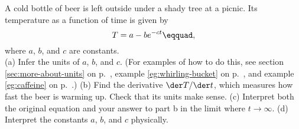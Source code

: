 A cold bottle of beer is left outside under a shady tree
at a picnic. Its temperature as a function of time is given
by
\begin{equation*}
  T = a - b e^{-ct}\eqquad,
\end{equation*}
where $a$, $b$, and $c$ are constants.\\
(a) Infer the units of $a$, $b$, and $c$. (For examples of how to do this, see
section \ref{sec:more-about-units} on p.~\pageref{sec:more-about-units},
example \ref{eg:whirling-bucket} on p.~\pageref{eg:whirling-bucket}, and
example \ref{eg:caffeine} on p.~\pageref{eg:caffeine}.)\hwendpart
(b) Find the derivative $\der T/\der t$, which measures how fast the beer
is warming up. Check that its units make sense.\hwendpart
(c) Interpret both the original equation and
your answer to part b in the limit where $t\rightarrow\infty$.\hwendpart
(d) Interpret the constants $a$, $b$, and $c$ physically.
